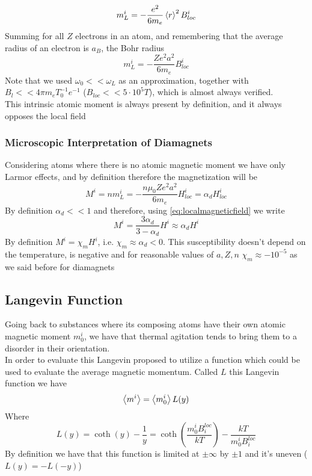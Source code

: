 \documentclass[../electromagnetism.tex]{subfiles}
\begin{document}
\begin{equation}
	m^i_L=-\frac{e^2}{6m_e}\expval{r}^2B^i_{loc}
	\label{eq:larmormoment}
\end{equation}
Summing for all $Z$ electrons in an atom, and remembering that the average radius of an electron is $a_B$, the Bohr radius
\begin{equation}
	m^i_L=-\frac{Ze^2a^2}{6m_e}B^i_{loc}
	\label{eq:larmormomentatom}
\end{equation}
Note that we used $\omega_0<<\omega_L$ as an approximation, together with $B_l<<4\pi m_eT_0^{-1}e^{-1}$ ($B_{loc}<<5\cdot10^{5}\unit{T}$), which is almost always verified.\\
This intrinsic atomic moment is always present by definition, and it always opposes the local field
\subsubsection{Microscopic Interpretation of Diamagnets}
Considering atoms where there is no atomic magnetic moment we have only Larmor effects, and by definition therefore the magnetization will be
\begin{equation}
	M^i=nm^i_L=-\frac{n\mu_0Ze^2a^2}{6m_e}H^i_{loc}=\alpha_dH^i_{loc}
	\label{eq:magnetizationdiamagnets}
\end{equation}
By definition $\alpha_d<<1$ and therefore, using \eqref{eq:localmagneticfield} we write
\begin{equation}
	M^i=\frac{3\alpha_d}{3-\alpha_d}H^i\approx\alpha_dH^i
	\label{eq:magvshdiam}
\end{equation}
By definition $M^i=\chi_mH^i$, i.e. $\chi_m\approx\alpha_d<0$. This susceptibility doesn't depend on the temperature, is negative and for reasonable values of $a,Z,n$ $\chi_m\approx-10^{-5}$ as we said before for diamagnets
\subsection{Langevin Function}
Going back to substances where its composing atoms have their own atomic magnetic moment $m_0^i$, we have that thermal agitation tends to bring them to a disorder in their orientation.\\
In order to evaluate this Langevin proposed to utilize a function which could be used to evaluate the average magnetic momentum. Called $L$ this Langevin function we have
\begin{equation}
	\expval{m^i}=\expval{m^i_0}L(y)
	\label{eq:avgmomlangevin}
\end{equation}
Where
\begin{equation}
	L(y)=\coth\left( y \right)-\frac{1}{y}=\coth\left( \frac{m_0^iB_{i}^{loc}}{kT} \right)-\frac{kT}{m_0^iB_i^{loc}}
	\label{eq:Langevinfunc}
\end{equation}
By definition we have that this function is limited at $\pm\infty$ by $\pm1$ and it's uneven ($L(y)=-L(-y)$)
\end{document}
